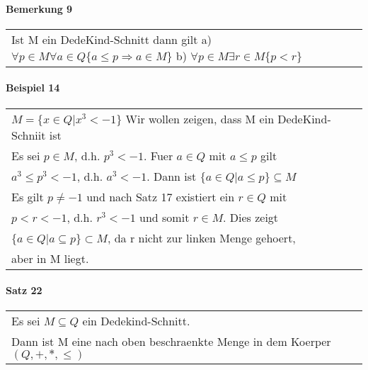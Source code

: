 \documentclass[a4paper]{scrartcl}
\begin{document}
\paragraph{Bemerkung 9}
\begin{tabbing}
\begin{tabular}{l}
Ist M ein DedeKind-Schnitt dann gilt
a) $\forall p\in M \forall a\in Q \{ a\leq p \Rightarrow a\in M \}$
b) $\forall p\in M \exists r\in M \{ p<r \}$
\end{tabular}
\end{tabbing}

\paragraph{Beispiel 14}
\begin{tabbing}
\begin{tabular}{l}
$M=\{ x\in Q|x^3 < -1 \}$ Wir wollen zeigen, dass M ein DedeKind-Schniit ist\\
Es sei $p\in M$, d.h. $p^3<-1$. Fuer $a\in Q$ mit $a\leq p$ gilt\\
$a^3 \leq p^3 < -1$, d.h. $a^3 < -1$. Dann ist $\{ a\in Q|a \leq p\}\subseteq M$\\
Es gilt $p \neq -1$ und nach Satz 17 existiert ein $r\in Q$ mit\\
$p < r < -1$, d.h. $r^3<-1$ und somit $r\in M$. Dies zeigt\\
$\{ a\in Q|a\subseteq p\}\subset M$, da r nicht zur linken Menge gehoert,\\
aber in M liegt.
\end{tabular}
\end{tabbing}

\paragraph{Satz 22}
\begin{tabbing}
\begin{tabular}{l}
Es sei $M \subseteq Q$ ein Dedekind-Schnitt.\\
Dann ist M eine nach oben beschraenkte Menge in dem Koerper $(Q,+,*,\leq)$\\
\end{tabular}
\end{tabbing}
\end{document}
